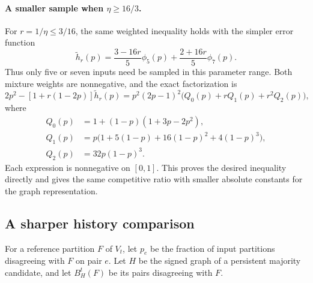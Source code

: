\documentclass[11pt]{article}
\begin{document}
\paragraph{A smaller sample when $\eta\ge16/3$.}
For $r=1/\eta\le3/16$, the same weighted inequality holds with the
simpler error function
\[
 \widetilde h_r(p)
   =\frac{3-16r}{5}\phi_5(p)+\frac{2+16r}{5}\phi_7(p).
\]
Thus only five or seven inputs need be sampled in this parameter range.
Both mixture weights are nonnegative, and the exact factorization is
\[
 2p^2-[1+r(1-2p)]\widetilde h_r(p)
 =p^2(2p-1)^2\bigl(Q_0(p)+rQ_1(p)+r^2Q_2(p)\bigr),
\]
where
\begin{align*}
 Q_0(p)&=1+(1-p)(1+3p-2p^2),\\
 Q_1(p)&=p\bigl(1+5(1-p)+16(1-p)^2+4(1-p)^3\bigr),\\
 Q_2(p)&=32p(1-p)^3.
\end{align*}
Each expression is nonnegative on $[0,1]$. This proves the desired
inequality directly and gives the same competitive ratio with smaller
absolute constants for the graph representation.

\subsection{A sharper history comparison}

For a reference partition $F$ of $V_t$, let $p_e$ be the fraction of
input partitions disagreeing with $F$ on pair $e$. Let $H$ be the signed
graph of a persistent majority candidate, and let $B_H^t(F)$ be its
pairs disagreeing with $F$.
\end{document}
